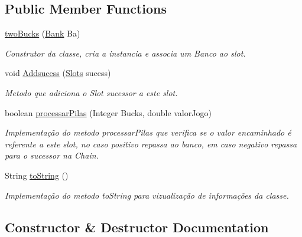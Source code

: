 \subsection*{Public Member Functions}
\begin{DoxyCompactItemize}
\item 
\mbox{\hyperlink{classchain_of_responsability_pattern_1_1two_bucks_a3d97b59db17c88f8762d15e1c99b1493}{two\+Bucks}} (\mbox{\hyperlink{classmediator_pattern_1_1_bank}{Bank}} Ba)
\begin{DoxyCompactList}\small\item\em Construtor da classe, cria a instancia e associa um Banco ao slot. \end{DoxyCompactList}\item 
void \mbox{\hyperlink{classchain_of_responsability_pattern_1_1two_bucks_aee4fde4f5cd634df654a5f384d4bc483}{Addsucess}} (\mbox{\hyperlink{interfacechain_of_responsability_pattern_1_1_slots}{Slots}} sucess)
\begin{DoxyCompactList}\small\item\em Metodo que adiciona o Slot sucessor a este slot. \end{DoxyCompactList}\item 
boolean \mbox{\hyperlink{classchain_of_responsability_pattern_1_1two_bucks_ac2c6c72c1e3d129c2e414f744196f547}{processar\+Pilas}} (Integer Bucks, double valor\+Jogo)
\begin{DoxyCompactList}\small\item\em Implementação do metodo processar\+Pilas que verifica se o valor encaminhado é referente a este slot, no caso positivo repassa ao banco, em caso negativo repassa para o sucessor na Chain. \end{DoxyCompactList}\item 
String \mbox{\hyperlink{classchain_of_responsability_pattern_1_1two_bucks_afc5049ee6a7d925bc945d717d2be8d19}{to\+String}} ()
\begin{DoxyCompactList}\small\item\em Implementação do metodo to\+String para vizualização de informações da classe. \end{DoxyCompactList}\end{DoxyCompactItemize}


\subsection{Constructor \& Destructor Documentation}
\mbox{\label{classchain_of_responsability_pattern_1_1two_bucks_a3d97b59db17c88f8762d15e1c99b1493}} 
